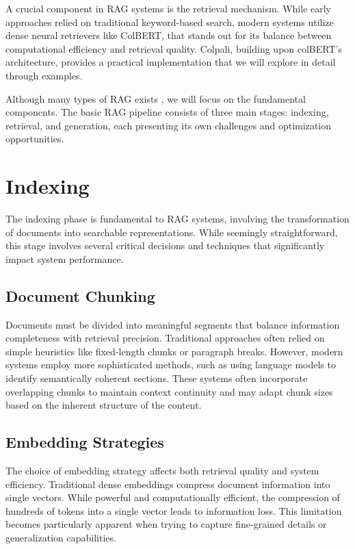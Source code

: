 \documentclass[notoc, tikz]{tufte-handout}
\begin{document}
A crucial component in RAG systems is the retrieval mechanism. While early approaches relied on traditional keyword-based search, modern systems utilize dense neural retrievers like ColBERT, that stands out for its balance between computational efficiency and retrieval quality. Colpali, building upon colBERT's architecture, provides a practical implementation that we will explore in detail through examples.

Although many types of RAG exists \citep{gao2023retrieval}, we will focus on the fundamental components. The basic RAG pipeline consists of three main stages: indexing, retrieval, and generation, each presenting its own challenges and optimization opportunities.



\section{Indexing}

The indexing phase is fundamental to RAG systems, involving the transformation of documents into searchable representations. While seemingly straightforward, this stage involves several critical decisions and techniques that significantly impact system performance.

\subsection{Document Chunking}
Documents must be divided into meaningful segments that balance information completeness with retrieval precision. Traditional approaches often relied on simple heuristics like fixed-length chunks or paragraph breaks. However, modern systems employ more sophisticated methods, such as using language models to identify semantically coherent sections. These systems often incorporate overlapping chunks to maintain context continuity and may adapt chunk sizes based on the inherent structure of the content.

\subsection{Embedding Strategies}

The choice of embedding strategy affects both retrieval quality and system efficiency. Traditional dense embeddings compress document information into single vectors. While powerful and computationally efficient, the compression of hundreds of tokens into a single vector leads to information loss. This limitation becomes particularly apparent when trying to capture fine-grained details or generalization capabilities.
\end{document}
